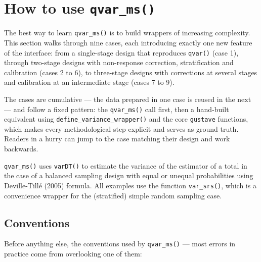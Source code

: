 \documentclass[
]{article}
\begin{document}
\section{\texorpdfstring{How to use
\texttt{qvar\_ms()}}{How to use qvar\_ms()}}\label{how-to-use-qvar_ms}

The best way to learn \texttt{qvar\_ms()} is to build wrappers of
increasing complexity. This section walks through nine cases, each
introducing exactly one new feature of the interface: from a
single-stage design that reproduces \texttt{qvar()} (case 1), through
two-stage designs with non-response correction, stratification and
calibration (cases 2 to 6), to three-stage designs with corrections at
several stages and calibration at an intermediate stage (cases 7 to 9).

The cases are cumulative --- the data prepared in one case is reused in
the next --- and follow a fixed pattern: the \texttt{qvar\_ms()} call
first, then a hand-built equivalent using
\texttt{define\_variance\_wrapper()} and the core \texttt{gustave}
functions, which makes every methodological step explicit and serves as
ground truth. Readers in a hurry can jump to the case matching their
design and work backwards.

\texttt{qvar\_ms()} uses \texttt{varDT()} to estimate the variance of
the estimator of a total in the case of a balanced sampling design with
equal or unequal probabilities using Deville-Tillé (2005) formula. All
examples use the function \texttt{var\_srs()}, which is a convenience
wrapper for the (stratified) simple random sampling case.

\subsection{Conventions}\label{conventions}

Before anything else, the conventions used by \texttt{qvar\_ms()} ---
most errors in practice come from overlooking one of them:
\end{document}
